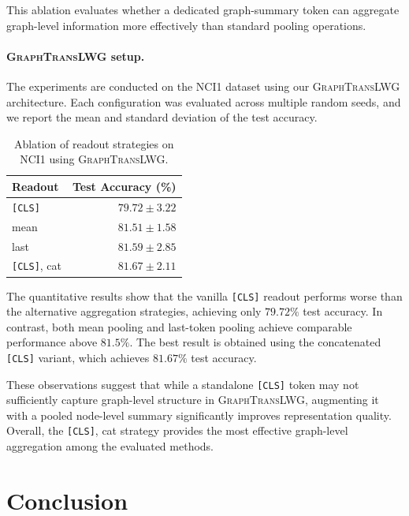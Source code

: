 \documentclass[11pt]{article}
\begin{document}
This ablation evaluates whether a dedicated graph-summary token can aggregate graph-level information more effectively than standard pooling operations.

\paragraph{\textsc{GraphTransLWG} setup.}
The experiments are conducted on the \textsf{NCI1} dataset using our \textsc{GraphTransLWG} architecture. Each configuration was evaluated across multiple random seeds, and we report the mean and standard deviation of the test accuracy.

\begin{table}[h]
\centering
\caption{Ablation of readout strategies on NCI1 using \textsc{GraphTransLWG}.}
\label{tab:ablation}
\begin{tabular}{lr}
\toprule
\textbf{Readout} & \textbf{Test Accuracy (\%)} \\
\midrule
\texttt{[CLS]} & $79.72 \pm 3.22$ \\
mean & $81.51 \pm 1.58$ \\
last & $81.59 \pm 2.85$ \\
\texttt{[CLS]}, cat & $\mathbf{81.67 \pm 2.11}$ \\
\bottomrule
\end{tabular}
\end{table}

The quantitative results show that the vanilla \texttt{[CLS]} readout performs worse than the alternative aggregation strategies, achieving only $79.72\%$ test accuracy. In contrast, both mean pooling and last-token pooling achieve comparable performance above $81.5\%$. The best result is obtained using the concatenated \texttt{[CLS]} variant, which achieves $81.67\%$ test accuracy.

These observations suggest that while a standalone \texttt{[CLS]} token may not sufficiently capture graph-level structure in \textsc{GraphTransLWG}, augmenting it with a pooled node-level summary significantly improves representation quality. Overall, the \texttt{[CLS]}, cat strategy provides the most effective graph-level aggregation among the evaluated methods.


\section{Conclusion}
\end{document}
